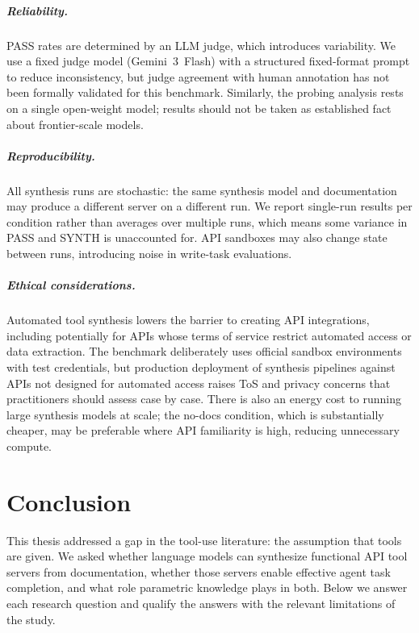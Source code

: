 \documentclass[12pt]{report}
\begin{document}
\paragraph{Reliability.}
PASS rates are determined by an LLM judge, which introduces variability.
We use a fixed judge model (Gemini~3~Flash) with a structured fixed-format
prompt to reduce inconsistency, but judge agreement with human annotation
has not been formally validated for this benchmark. Similarly, the
probing analysis rests on a single open-weight model; results should not
be taken as established fact about frontier-scale models.

\paragraph{Reproducibility.}
All synthesis runs are stochastic: the same synthesis model and documentation
may produce a different server on a different run. We report single-run
results per condition rather than averages over multiple runs, which means
some variance in PASS and SYNTH is unaccounted for. API sandboxes may also
change state between runs, introducing noise in write-task evaluations.

\paragraph{Ethical considerations.}
Automated tool synthesis lowers the barrier to creating API integrations,
including potentially for APIs whose terms of service restrict automated
access or data extraction. The benchmark deliberately uses official sandbox
environments with test credentials, but production deployment of synthesis
pipelines against APIs not designed for automated access raises ToS and
privacy concerns that practitioners should assess case by case. There is
also an energy cost to running large synthesis models at scale; the
no-docs condition, which is substantially cheaper, may be preferable
where API familiarity is high, reducing unnecessary compute.

\chapter{Conclusion}
\label{ch:conclusion}

This thesis addressed a gap in the tool-use literature: the assumption that
tools are given. We asked whether language models can synthesize functional
API tool servers from documentation, whether those servers enable effective
agent task completion, and what role parametric knowledge plays in both.
Below we answer each research question and qualify the answers with the
relevant limitations of the study.
\end{document}
